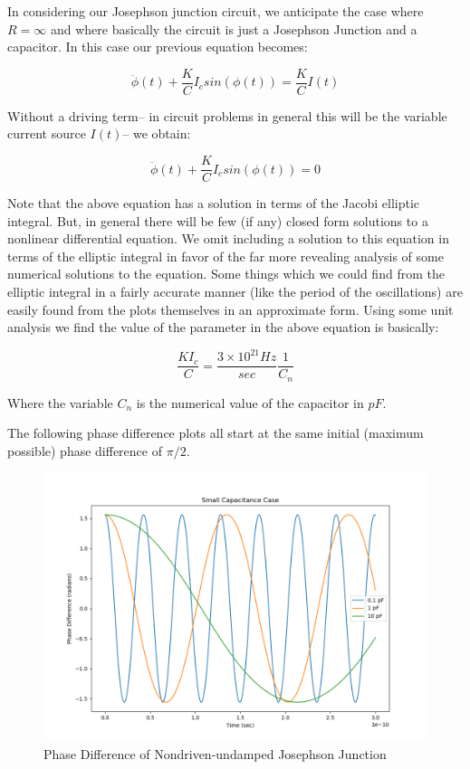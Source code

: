 \documentclass[12pt]{article}
\begin{document}
In considering our Josephson junction circuit, we anticipate the case where $R = \infty$ and where basically the circuit is just a Josephson Junction and a capacitor.  In this case our previous equation becomes:

\begin{equation}
\ddot{\phi}(t) + \dfrac{K}{C} I_c sin(\phi(t)) = \dfrac{K}{C} I(t)
\end{equation}

Without a driving term-- in circuit problems in general this will be the variable current source $I(t)$-- we obtain:

\begin{equation}
\ddot{\phi}(t) + \dfrac{K}{C} I_c sin(\phi(t)) = 0
\end{equation}

Note that the above equation has a solution in terms of the Jacobi elliptic integral.  But, in general there will be few (if any) closed form solutions to a nonlinear differential equation.  We  omit including a solution to this equation in terms of the elliptic integral in favor of the far more revealing analysis of some numerical solutions to the equation.  Some things which we could find from the elliptic integral in a fairly accurate manner (like the period of the oscillations) are easily found from the plots themselves in an approximate form.  Using some unit analysis we find the value of the parameter in the above equation is basically:

\begin{equation}
\dfrac{KI_c}{C} = \dfrac{3 \times 10^{21} Hz}{sec} \dfrac{1}{C_n}
\end{equation}

Where the variable $C_n$ is the numerical value of the capacitor in $pF$.

The following phase difference plots all start at the same initial (maximum possible) phase difference of $\pi / 2$.

\begin{figure}
\caption{Phase Difference of Nondriven-undamped Josephson Junction}
\begin{center}
\includegraphics[scale=0.60]{uud-jjsmallc.png}
\end{center}
\end{figure}
\end{document}
